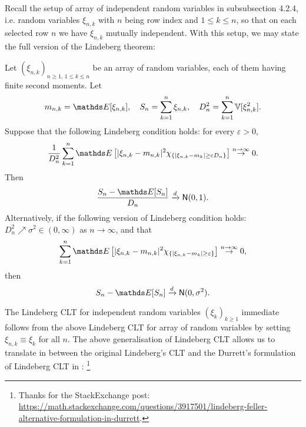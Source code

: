 \begin{unexaminable}
Recall the setup of array of independent random variables in subsubsection 4.2.4, i.e. random variables $\xi_{n,k}$ with $n$ being row index and $1 \leq k \leq n$, so that on each selected row $n$ we have $\xi_{n,k}$ mutually independent. With this setup, we may state the full version of the Lindeberg theorem:
\begin{theorem}
Let $(\xi_{n,k})_{n\geq 1, \, 1\leq k\leq n}$ be an array of random variables, each of them having finite second moments. Let 
\begin{equation*}
m_{n,k} = \E[\xi_{n,k}], \quad S_n = \sum_{k=1}^n \xi_{n,k}, \quad D_n^2 = \sum_{k=1}^n \V[\xi_{n,k}^2].
\end{equation*}
Suppose that the following Lindeberg condition holds: for every $\varepsilon > 0$, 
\begin{equation}
    \frac{1}{D_n^2}\sum_{k=1}^n \E\sqbracket{|\xi_{n,k} - m_{n,k}|^2 \chi_{\set{|\xi_{n,k}-m_k|\ge \varepsilon D_n}}} \overset{n\to\infty} \to 0.
\end{equation}
Then 
\begin{equation*}
    \frac{S_n - \E[S_n]}{D_n} \xrightarrow{d} \mathsf{N}(0,1).
\end{equation*}
Alternatively, if the following version of Lindeberg condition holds: $D_n^2 \nearrow \sigma^2 \in (0,\infty)$ as $n \to \infty$, and that 
\begin{equation}
    \sum_{k=1}^n \E\sqbracket{|\xi_{n,k} - m_{n,k}|^2 \chi_{\set{|\xi_{n,k}-m_k|\ge \varepsilon}}} \overset{n\to\infty} \to 0,
\end{equation}
then 
\begin{equation*}
    S_n - \E[S_n] \xrightarrow{d} \mathsf{N}(0,\sigma^2).
\end{equation*}
\end{theorem}

The Lindeberg CLT for independent random variables $(\xi_k)_{k\geq 1}$ immediate follows from the above Lindeberg CLT for array of random variables by setting $\xi_{n,k} \equiv \xi_k$ for all $n$. The above generalisation of Lindeberg CLT allows us to translate in between the original Lindeberg's CLT and the Durrett's formulation of Lindeberg CLT in \cite{Durrett}: \footnote{Thanks for the StackExchange post: \url{https://math.stackexchange.com/questions/3917501/lindeberg-feller-alternative-formulation-in-durrett}.}


\end{unexaminable}
